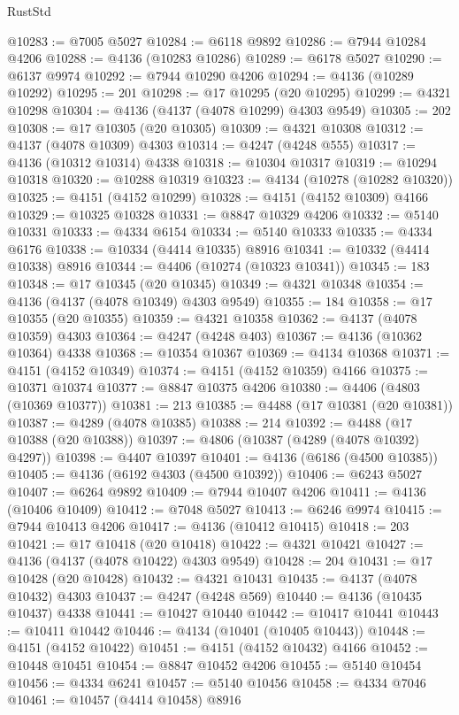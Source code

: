 \begin{lexlean}{RustStd}
\begin{coremodule}
@10283 := @7005 @5027
@10284 := @6118 @9892
@10286 := @7944 @10284 @4206
@10288 := @4136 (@10283 @10286)
@10289 := @6178 @5027
@10290 := @6137 @9974
@10292 := @7944 @10290 @4206
@10294 := @4136 (@10289 @10292)
@10295 := 201
@10298 := @17 @10295 (@20 @10295)
@10299 := @4321 @10298
@10304 := @4136 (@4137 (@4078 @10299) @4303 @9549)
@10305 := 202
@10308 := @17 @10305 (@20 @10305)
@10309 := @4321 @10308
@10312 := @4137 (@4078 @10309) @4303
@10314 := @4247 (@4248 @555)
@10317 := @4136 (@10312 @10314) @4338
@10318 := @10304 @10317
@10319 := @10294 @10318
@10320 := @10288 @10319
@10323 := @4134 (@10278 (@10282 @10320))
@10325 := @4151 (@4152 @10299)
@10328 := @4151 (@4152 @10309) @4166
@10329 := @10325 @10328
@10331 := @8847 @10329 @4206
@10332 := @5140 @10331
@10333 := @4334 @6154
@10334 := @5140 @10333
@10335 := @4334 @6176
@10338 := @10334 (@4414 @10335) @8916
@10341 := @10332 (@4414 @10338) @8916
@10344 := @4406 (@10274 (@10323 @10341))
@10345 := 183
@10348 := @17 @10345 (@20 @10345)
@10349 := @4321 @10348
@10354 := @4136 (@4137 (@4078 @10349) @4303 @9549)
@10355 := 184
@10358 := @17 @10355 (@20 @10355)
@10359 := @4321 @10358
@10362 := @4137 (@4078 @10359) @4303
@10364 := @4247 (@4248 @403)
@10367 := @4136 (@10362 @10364) @4338
@10368 := @10354 @10367
@10369 := @4134 @10368
@10371 := @4151 (@4152 @10349)
@10374 := @4151 (@4152 @10359) @4166
@10375 := @10371 @10374
@10377 := @8847 @10375 @4206
@10380 := @4406 (@4803 (@10369 @10377))
@10381 := 213
@10385 := @4488 (@17 @10381 (@20 @10381))
@10387 := @4289 (@4078 @10385)
@10388 := 214
@10392 := @4488 (@17 @10388 (@20 @10388))
@10397 := @4806 (@10387 (@4289 (@4078 @10392) @4297))
@10398 := @4407 @10397
@10401 := @4136 (@6186 (@4500 @10385))
@10405 := @4136 (@6192 @4303 (@4500 @10392))
@10406 := @6243 @5027
@10407 := @6264 @9892
@10409 := @7944 @10407 @4206
@10411 := @4136 (@10406 @10409)
@10412 := @7048 @5027
@10413 := @6246 @9974
@10415 := @7944 @10413 @4206
@10417 := @4136 (@10412 @10415)
@10418 := 203
@10421 := @17 @10418 (@20 @10418)
@10422 := @4321 @10421
@10427 := @4136 (@4137 (@4078 @10422) @4303 @9549)
@10428 := 204
@10431 := @17 @10428 (@20 @10428)
@10432 := @4321 @10431
@10435 := @4137 (@4078 @10432) @4303
@10437 := @4247 (@4248 @569)
@10440 := @4136 (@10435 @10437) @4338
@10441 := @10427 @10440
@10442 := @10417 @10441
@10443 := @10411 @10442
@10446 := @4134 (@10401 (@10405 @10443))
@10448 := @4151 (@4152 @10422)
@10451 := @4151 (@4152 @10432) @4166
@10452 := @10448 @10451
@10454 := @8847 @10452 @4206
@10455 := @5140 @10454
@10456 := @4334 @6241
@10457 := @5140 @10456
@10458 := @4334 @7046
@10461 := @10457 (@4414 @10458) @8916

\end{coremodule}
\end{lexlean}
